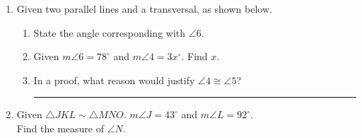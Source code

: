 \documentclass[12pt, twoside]{article}
\begin{document}
\begin{enumerate}
\item Given two parallel lines and a transversal, as shown below.
  \begin{center}
  \end{center}
  \begin{enumerate}
    \item State the angle corresponding with $\angle 6$. \vspace{1cm}
    \item Given $m\angle 6 = 78^\circ$ and $m\angle 4 = 3x^\circ$. Find $x$. \vspace{3.5cm}
    \item In a proof, what reason would justify $\angle 4 \cong \angle 5$? \rule{6cm}{0.15mm}
  \end{enumerate}  \vspace{2cm}

   \item Given $\triangle JKL \sim \triangle MNO$. $m\angle J = 43^\circ$ and $m\angle L = 92^\circ$.\\
   Find the measure of $\angle N$.

\end{enumerate}
\newpage
\setcounter{page}{1}
\end{document}
